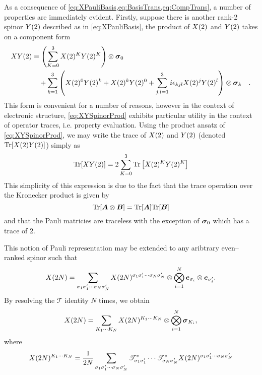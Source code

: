 As a consequence of \cref{eq:XPauliBasis,eq:BasisTrans,eq:CompTrans}, a number of properties are immediately evident. Firstly,
suppose there is another rank-2 spinor $\spinor{2}{Y}$ described as in \cref{eq:XPauliBasis}, the product of $\spinor{2}{X}$ and 
$\spinor{2}{Y}$ takes on a component form
\begin{align}
\label{eq:XYSpinorProd}
\spinor{2}{XY} &= \left(\sum_{K = 0 }^3 \spinor{2}{X}^K \spinor{2}{Y}^K\right) \otimes \pauli{0}   \nonumber \\
&\quad  + \sum_{k = 1}^3 \left( \spinor{2}{X}^0 \spinor{2}{Y}^k + \spinor{2}{X}^k \spinor{2}{Y}^0 + \sum_{j,l = 1}^3 i\epsilon_{kjl}\spinor{2}{X}^j \spinor{2}{Y}^l \right) 
    \otimes \pauli{k}
    \quad.
\end{align}
This form is convenient for a number of reasons, however in the context of electronic structure, \cref{eq:XYSpinorProd} exhibits particular utility in the
context of operator traces, i.e. property evaluation. Using the product ansatz of \cref{eq:XYSpinorProd}, we may write the trace of $\spinor{2}{X}$ and
$\spinor{2}{Y}$ (denoted $\mathrm{Tr}[\spinor{2}{X}\spinor{2}{Y}]$) simply as
\begin{equation}
\mathrm{Tr}[\spinor{2}{XY}] = 2\sum_{K = 0}^3 \mathrm{Tr}\left[\spinor{2}{X}^K\spinor{2}{Y}^K\right]
\end{equation}
This simplicity of this expression is due to the fact that the trace operation over the Kronecker product is given by
\begin{equation}
\mathrm{Tr}[\vc{A} \otimes \vc{B}] = \mathrm{Tr}[\vc{A}]\mathrm{Tr}[\vc{B}]
\end{equation}
and that the Pauli matricies are traceless with the exception of $\pauli{0}$ which has a trace of 2.

This notion of Pauli representation may be extended to any aribtrary even--ranked spinor such that
\begin{equation}
\spinor{2N}{X} = \sum_{\sigma_1\sigma_1'\cdots \sigma_N\sigma_N'} \spinor{2N}{X}^{\sigma_1\sigma_1'\cdots \sigma_N\sigma_N'} \otimes 
  \bigotimes_{i = 1}^N  \vc e_{\sigma_i} \otimes \vc e_{\sigma_i'}.
\end{equation}
By resolving the $\mathscr{T}$ identity $N$ times, we obtain
\begin{equation}
\spinor{2N}{X} = \sum_{K_1\cdots K_N} \spinor{2N}{X}^{K_1\cdots K_N} \otimes
  \bigotimes_{i=1}^N \pauli{K_i},
\end{equation}
where
\begin{equation}
\spinor{2N}{X}^{K_1\cdots K_N} = \frac{1}{2N} \sum_{\sigma_1\sigma_1'\cdots \sigma_N\sigma_N'} 
  \mathscr{T}^*_{\sigma_1\sigma'_1}\cdots\mathscr{T}^*_{\sigma_N\sigma'_N}\spinor{2N}{X}^{\sigma_1\sigma_1'\cdots \sigma_N\sigma_N'}  
\end{equation}
